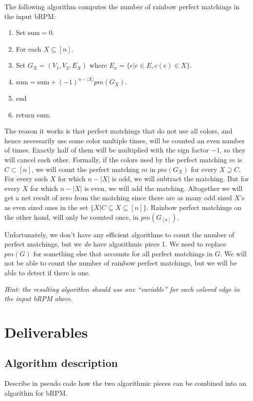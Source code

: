\documentclass{tufte-handout}
\begin{document}
 The following algorithm computes the number of rainbow perfect matchings in the input bRPM:

\begin{enumerate}
\item Set $\mbox{sum}=0$.
\item For each $X\subseteq [n]$.
\item \hspace{5mm} Set $G_X=(V_1,V_2,E_X)$ where $E_x=\{e|e\in E, c(e)\in X\}$.
\item \hspace{5mm} $\mbox{sum}=\mbox{sum}+(-1)^{n-|X|}pm(G_X)$.
\item end
\item return \mbox{sum}.
\end{enumerate}

The reason it works is that perfect matchings that do not use all colors, and hence necessarily use some color multiple times, will be counted an even number of times. Exactly half of them will be multiplied with the sign factor $-1$, so they will cancel each other. Formally, if the colors used by the perfect matching $m$ is $C\subset [n]$, we will count the perfect matching $m$ in $pm(G_X)$ for every $X\supseteq C$. For every such $X$ for which $n-|X|$ is odd, we will subtract the matching. But for every $X$ for which $n-|X|$ is even, we will add the matching. Altogether we will get a net result of zero from the matching since there are as many odd sized $X$'s as even sized ones in the set  $\{X|C\subseteq X \subseteq [n]\}$. Rainbow perfect matchings on the other hand, will only be counted once, in $pm(G_{[n]})$.

\bigskip
Unfortunately, we don't have any efficient algorithms to count the number of perfect matchings, but we \emph{do} have algorithmic piece 1.  We need to replace $pm(G)$ for something else that accounts for all perfect matchings in $G$. We will not be able to count the number of rainbow perfect matchings, but we will be able to detect if there is one.

\noindent \emph{Hint: the resulting algorithm should use one ``variable'' for each colored edge in the input bRPM above}.

\section*{Deliverables}
\subsection*{Algorithm description}
Describe in pseudo code how the two algorithmic pieces can be combined into an algorithm for bRPM.
\end{document}
